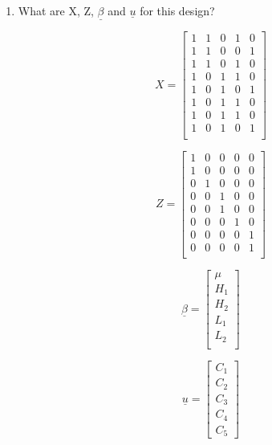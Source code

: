 \documentclass[12pt,a4paper]{paper}
\begin{document}
\begin{enumerate}
\begin{enumerate}
\item What are X, Z, $\underline{\beta}$ and $\underline{u}$ for this design?\\
\begin{minipage}[c]{0.3\linewidth}
\[X = \left[\begin{array}{cccccc}
1 & 1 & 0 & 1 & 0 \\ 
  1 & 1 & 0 & 0 & 1 \\ 
  1 & 1 & 0 & 1 & 0 \\ 
  1 & 0 & 1 & 1 & 0 \\ 
  1 & 0 & 1 & 0 & 1 \\ 
  1 & 0 & 1 & 1 & 0 \\ 
  1 & 0 & 1 & 1 & 0 \\ 
  1 & 0 & 1 & 0 & 1 \\ 
\end{array}\right]\]
\end{minipage}
\begin{minipage}[c]{0.3\linewidth}
\[Z = \left[\begin{array}{ccccc}
1 & 0 & 0 & 0 & 0 \\ 
  1 & 0 & 0 & 0 & 0 \\ 
  0 & 1 & 0 & 0 & 0 \\ 
  0 & 0 & 1 & 0 & 0 \\ 
  0 & 0 & 1 & 0 & 0 \\ 
  0 & 0 & 0 & 1 & 0 \\ 
  0 & 0 & 0 & 0 & 1 \\ 
  0 & 0 & 0 & 0 & 1 \\ 
  \end{array}\right]\]
  \end{minipage}
\begin{minipage}[c]{0.15\linewidth}
\[\underline{\beta} =\left[\begin{array}{c}\mu\\H_{1}\\H_{2}\\L_{1}\\L_{2}\\\end{array}\right]\]
\end{minipage}
\begin{minipage}[c]{0.15\linewidth}
\[\underline{u} = \left[\begin{array}{c}C_{1}\\C_{2}\\C_{3}\\C_{4}\\C_{5}\end{array}\right]\]

\end{minipage}
\end{enumerate}
\end{enumerate}
\end{document}
